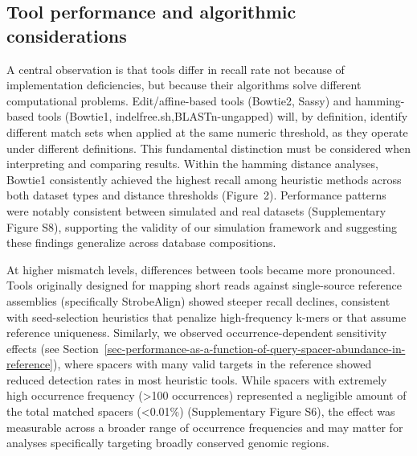 \documentclass[
]{article}
\begin{document}
\subsection{Tool performance and algorithmic
considerations}\label{sec-tool-performance-discussion}

A central observation is that tools differ in recall rate not because of
implementation deficiencies, but because their algorithms solve
different computational problems. Edit/affine-based tools (Bowtie2,
Sassy) and hamming-based tools (Bowtie1, indelfree.sh,BLASTn-ungapped)
will, by definition, identify different match sets when applied at the
same numeric threshold, as they operate under different definitions.
This fundamental distinction must be considered when interpreting and
comparing results. Within the hamming distance analyses, Bowtie1
consistently achieved the highest recall among heuristic methods across
both dataset types and distance thresholds (Figure~2). Performance
patterns were notably consistent between simulated and real datasets
(Supplementary Figure S8), supporting the validity of our simulation
framework and suggesting these findings generalize across database
compositions.

At higher mismatch levels, differences between tools became more
pronounced. Tools originally designed for mapping short reads against
single-source reference assemblies (specifically StrobeAlign) showed
steeper recall declines, consistent with seed-selection heuristics that
penalize high-frequency k-mers or that assume reference uniqueness.
Similarly, we observed occurrence-dependent sensitivity effects (see
Section~\ref{sec-performance-as-a-function-of-query-spacer-abundance-in-reference}),
where spacers with many valid targets in the reference showed reduced
detection rates in most heuristic tools. While spacers with extremely
high occurrence frequency (\textgreater100 occurrences) represented a
negligible amount of the total matched spacers (\textless0.01\%)
(Supplementary Figure S6), the effect was measurable across a broader
range of occurrence frequencies and may matter for analyses specifically
targeting broadly conserved genomic regions.
\end{document}
